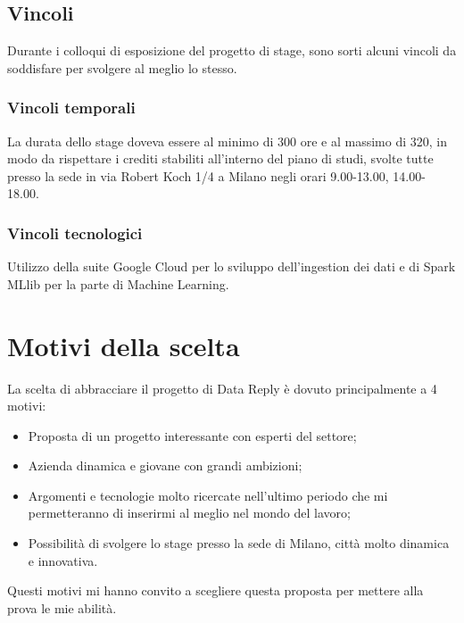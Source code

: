 \subsection{Vincoli}
Durante i colloqui di esposizione del progetto di stage, sono sorti alcuni vincoli da soddisfare per svolgere al meglio lo stesso.\\
\subsubsection{Vincoli temporali}
La durata dello stage doveva essere al minimo di 300 ore e al massimo di 320, in modo da rispettare i crediti stabiliti all'interno del piano di studi, svolte tutte presso la sede in via Robert Koch 1/4 a Milano negli orari 9.00-13.00, 14.00-18.00.
\subsubsection{Vincoli tecnologici}
Utilizzo della suite \gls{Google Cloud} per lo sviluppo dell'ingestion dei dati e di Spark MLlib per la parte di Machine Learning.
\section{Motivi della scelta}
La scelta di abbracciare il progetto di Data Reply è dovuto principalmente a 4 motivi:
\begin{itemize}
	\item Proposta di un progetto interessante con esperti del settore;
	\item Azienda dinamica e giovane con grandi ambizioni;
	\item Argomenti e tecnologie molto ricercate nell'ultimo periodo che mi permetteranno di inserirmi al meglio nel mondo del lavoro;
	\item Possibilità di svolgere lo stage presso la sede di Milano, città molto dinamica e innovativa.
\end{itemize}
Questi motivi mi hanno convito a scegliere questa proposta per mettere alla prova le mie abilità.